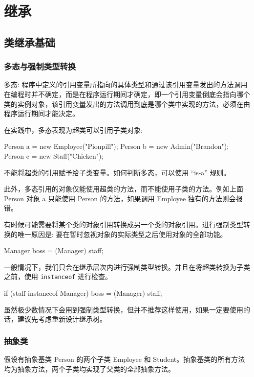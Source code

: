\section{继承}
\subsection{类继承基础}

\subsubsection{多态与强制类型转换}

多态: 程序中定义的引用变量所指向的具体类型和通过该引用变量发出的方法调用在编程时并不确定，而是在程序运行期间才确定，即一个引用变量倒底会指向哪个类的实例对象，该引用变量发出的方法调用到底是哪个类中实现的方法，必须在由程序运行期间才能决定。

在实践中，多态表现为超类可以引用子类对象:
\begin{Java}
Person a = new Employee("Pionpill");
Person b = new Admin("Brandon");
Person c = new Staff("Chicken");
\end{Java}

不能将超类的引用赋予给子类变量。如何判断多态，可以使用 ``is-a'' 规则。

此外，多态引用的对象仅能使用超类的方法，而不能使用子类的方法。例如上面 Person 对象 a 只能使用 Person 的方法，如果调用 Employee 独有的方法则会报错。

有时候可能需要将某个类的对象引用转换成另一个类的对象引用。进行强制类型转换的唯一原因是: 要在暂时忽视对象的实际类型之后使用对象的全部功能。

\begin{Java}
Manager boss = (Manager) staff;
\end{Java}

一般情况下，我们只会在继承层次内进行强制类型转换。并且在将超类转换为子类之前，使用 \texttt{instanceof} 进行检查。

\begin{Java}
if (staff instanceof Manager) {
    boss = (Manager) staff;
}
\end{Java}

虽然极少数情况下会用到强制类型转换，但并不推荐这样使用，如果一定要使用的话，建议先考虑重新设计继承树。

\subsubsection{抽象类}

假设有抽象基类 Person 的两个子类 Employee 和 Student。抽象基类的所有方法均为抽象方法，两个子类均实现了父类的全部抽象方法。

